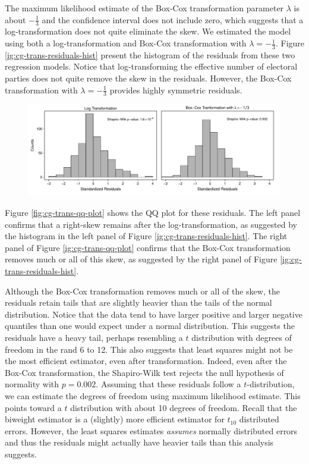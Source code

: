 \documentclass[12pt]{article}
\begin{document}
The maximum likelihood estimate of the Box-Cox transformation parameter $\lambda$ is about $-\frac{1}{3}$ and the confidence interval does not include zero, which suggests that a log-transformation does not quite eliminate the skew. We estimated the model using both a log-transformation and Box-Cox transformation with $\lambda = -\frac{1}{3}$. Figure \ref{ig:cg-trans-residuals-hist} present the histogram of the residuals from these two regression models. Notice that log-transforming the effective number of electoral parties does not quite remove the skew in the residuals. However, the Box-Cox transformation with $\lambda = -\frac{1}{3}$ provides highly symmetric residuals. 

\begin{figure}[h!]
\begin{center}
\includegraphics[width = \textwidth]{figs/cg-trans-residuals-hist.pdf}
\caption{}\label{fig:cg-trans-residuals-hist}
\end{center}
\end{figure}

Figure \ref{fig:cg-trans-qq-plot} shows the QQ plot for these residuals. The left panel confirms that a right-skew remains after the log-transformation, as suggested by the histogram in the left panel of Figure \ref{ig:cg-trans-residuals-hist}. The right panel of Figure \ref{ig:cg-trans-qq-plot} confirms that the Box-Cox transformation removes much or all of this skew, as suggested by the right panel of Figure \ref{ig:cg-trans-residuals-hist}. 

Although the Box-Cox transformation removes much or all of the skew, the residuals retain tails that are slightly heavier than the tails of the normal distribution. Notice that the data tend to have larger positive and larger negative quantiles than one would expect under a normal distribution. This suggests the residuals have a heavy tail, perhaps resembling a $t$ distribution with degrees of freedom in the rand 6 to 12. This also suggests that least squares might not be the most efficient estimator, even after transformation. Indeed, even after the Box-Cox transformation, the Shapiro-Wilk test rejects the null hypothesis of normality with $p = 0.002$. Assuming that these residuals follow a $t$-distribution, we can estimate the degrees of freedom using maximum likelihood estimate. This points toward a $t$ distribution with about 10 degrees of freedom. Recall that the biweight estimator is a (slightly) more efficient estimator for $t_{10}$ distributed errors. However, the least squares estimates \textit{assumes} normally distributed errors and thus the residuals might actually have heavier tails than this analysis suggests.
\end{document}
